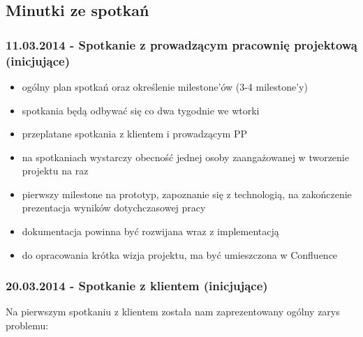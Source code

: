 \documentclass[polish, 12pt]{aghthesis}
\begin{document}
	\subsection{Minutki ze spotkań}
	
		\subsubsection*{11.03.2014 - Spotkanie z prowadzącym pracownię projektową (inicjujące)}
		
			\begin{itemize}
			
				\item ogólny plan spotkań oraz określenie milestone'ów (3-4 milestone'y)
				\item spotkania będą odbywać się co dwa tygodnie we wtorki
				\item przeplatane spotkania z klientem i prowadzącym PP
				\item na spotkaniach wystarczy obecność jednej osoby zaangażowanej w tworzenie projektu na raz
				\item pierwszy milestone na prototyp, zapoznanie się z technologią, na zakończenie prezentacja wyników dotychczasowej pracy
				\item dokumentacja powinna być rozwijana wraz z implementacją
				\item do opracowania krótka wizja projektu, ma być umieszczona w Confluence
						
			\end{itemize}
		
		\subsubsection*{20.03.2014 - Spotkanie z klientem (inicjujące)}
		
			Na pierwszym spotkaniu z klientem została nam zaprezentowany ogólny zarys problemu:
				
\end{document}
